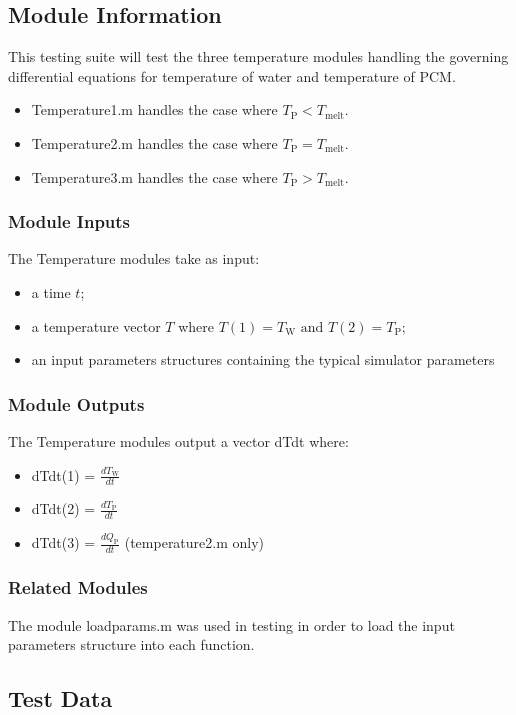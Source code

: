 \documentclass[12pt]{article}
\begin{document}
\subsection{Module Information}
This testing suite will test the three temperature modules handling the governing 
differential equations for temperature of water and temperature of PCM.
\begin{itemize}
\item Temperature1.m handles the case where $T_{\text{P}} < T_{\text{melt}}$.
\item Temperature2.m handles the case where $T_{\text{P}} = T_{\text{melt}}$.
\item Temperature3.m handles the case where $T_{\text{P}} > T_{\text{melt}}$.
\end{itemize}

\subsubsection{Module Inputs}
The Temperature modules take as input:
\begin{itemize}
\item a time $t$;
\item a temperature vector $T$ where $T(1) = T_{\text{W}} \text{ and } 
T(2) = T_{\text{P}}$;
\item an input parameters structures containing the typical simulator parameters
\end{itemize}

\subsubsection{Module Outputs}
The Temperature modules output a vector dTdt where:
\begin{itemize}
\item dTdt(1) = $\frac{dT_{\text{W}}}{dt}$
\item dTdt(2) = $\frac{dT_{\text{P}}}{dt}$
\item dTdt(3) = $\frac{dQ_{\text{P}}}{dt}$ (temperature2.m only)
\end{itemize}

\subsubsection{Related Modules}
The module loadparams.m was used in testing in order to load the input parameters
 structure into each function.

\subsection{Test Data}
\end{document}
